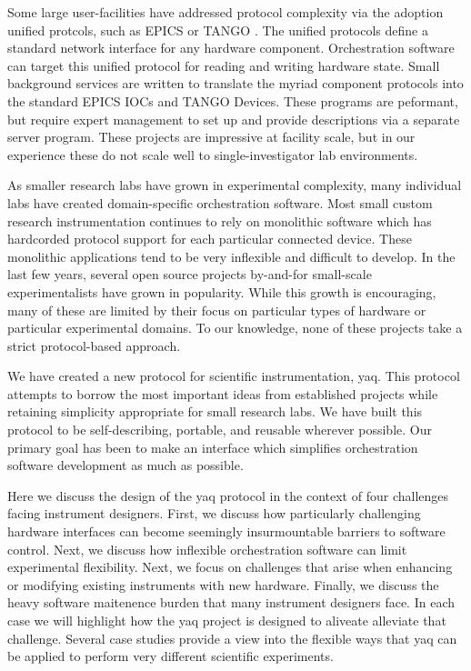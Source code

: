 Some large user-facilities have addressed protocol complexity via the adoption unified protcols, such as EPICS \cite{DalesioLR1991a} or TANGO \cite{AGotz1999TANGOA}.
The unified protocols define a standard network interface for any hardware component.
Orchestration software can target this unified protocol for reading and writing hardware state.
Small background services are written to translate the myriad component protocols into the standard EPICS IOCs and TANGO Devices.
These programs are peformant, but require expert management to set up and provide descriptions via a separate server program.
These projects are impressive at facility scale, but in our experience these do not scale well to single-investigator lab environments.

As smaller research labs have grown in experimental complexity, many individual labs have created domain-specific orchestration software.
Most small custom research instrumentation continues to rely on monolithic software which has hardcorded protocol support for each particular connected device.
These monolithic applications tend to be very inflexible and difficult to develop.
In the last few years, several open source projects by-and-for small-scale experimentalists have grown in popularity\cite{WeberSebastien2021a,Bogdanowicz2022,trspectrometer,Koerner_2019,Campagnola_2014,pymeasure,Giesbrecht_2022,pylablib}.
While this growth is encouraging, many of these are limited by their focus on particular types of hardware or particular experimental domains.
To our knowledge, none of these projects take a strict protocol-based approach.

We have created a new protocol for scientific instrumentation, yaq.
This protocol attempts to borrow the most important ideas from established projects while retaining simplicity appropriate for small research labs.
We have built this protocol to be self-describing, portable, and reusable wherever possible.
Our primary goal has been to make an interface which simplifies orchestration software development as much as possible.

Here we discuss the design of the yaq protocol in the context of four challenges facing instrument designers.
First, we discuss how particularly challenging hardware interfaces can become seemingly insurmountable barriers to software control.
Next, we discuss how inflexible orchestration software can limit experimental flexibility.
Next, we focus on challenges that arise when enhancing or modifying existing instruments with new hardware.
Finally, we discuss the heavy software maitenence burden that many instrument designers face.
In each case we will highlight how the yaq project is designed to aliveate alleviate that challenge.
Several case studies provide a view into the flexible ways that yaq can be applied to perform very different scientific experiments.

